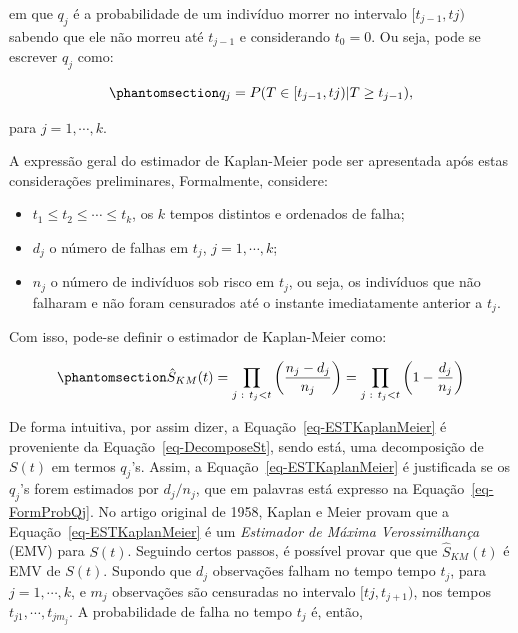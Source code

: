 \documentclass[
  12pt,
  letterpaper,
  DIV=11,
  numbers=noendperiod]{scrreprt}
\providecommand{\tightlist}{%
  \setlength{\itemsep}{0pt}\setlength{\parskip}{0pt}}\usepackage{longtable,booktabs,array}
\begin{document}
\noindent em que \(q_{j}\) é a probabilidade de um indivíduo morrer no
intervalo \([t_{j-1}, t{j})\) sabendo que ele não morreu até \(t_{j-1}\)
e considerando \(t_{0} = 0\). Ou seja, pode se escrever \(q_{j}\) como:

\begin{equation}\phantomsection\label{eq-FormProbQj}{
q_{j} = P(T \in [t_{j-1}, t{j}) | T \geq t_{j-1}),
}\end{equation}

\noindent para \(j = 1, \cdots, k\).

A expressão geral do estimador de Kaplan-Meier pode ser apresentada após
estas considerações preliminares, Formalmente, considere:

\begin{itemize}
\tightlist
\item
  \(t_{1} \leq t_{2} \leq \cdots \leq t_{k}\), os \(k\) tempos distintos
  e ordenados de falha;
\item
  \(d_{j}\) o número de falhas em \(t_{j}\), \(j = 1, \cdots, k\);
\item
  \(n_{j}\) o número de indivíduos sob risco em \(t_{j}\), ou seja, os
  indivíduos que não falharam e não foram censurados até o instante
  imediatamente anterior a \(t_{j}\).
\end{itemize}

Com isso, pode-se definir o estimador de Kaplan-Meier como:

\begin{equation}\phantomsection\label{eq-ESTKaplanMeier}{
\hat{S}_{KM}(t) = \prod_{j \text{ : } t_{j} < t} \left( \dfrac{n_{j} - d_{j}}{n_{j}} \right) = \prod_{j \text{ : } t_{j} < t} \left( 1 - \dfrac{d_{j}}{n_{j}} \right)
}\end{equation}

De forma intuitiva, por assim dizer, a Equação~\ref{eq-ESTKaplanMeier} é
proveniente da Equação~\ref{eq-DecomposeSt}, sendo está, uma
decomposição de \(S(t)\) em termos \(q_{j}\)'s. Assim, a
Equação~\ref{eq-ESTKaplanMeier} é justificada se os \(q_{j}\)'s forem
estimados por \(d_{j}/n_{j}\), que em palavras está expresso na
Equação~\ref{eq-FormProbQj}. No artigo original de 1958, Kaplan e Meier
provam que a Equação~\ref{eq-ESTKaplanMeier} é um \emph{Estimador de
Máxima Verossimilhança} (EMV) para \(S(t)\). Seguindo certos passos, é
possível provar que que \(\hat{S}_{KM}(t)\) é EMV de \(S(t)\). Supondo
que \(d_{j}\) observações falham no tempo tempo \(t_{j}\), para
\(j = 1, \cdots, k\), e \(m_{j}\) observações são censuradas no
intervalo \([t{j}, t_{j+1})\), nos tempos
\(t_{j1}, \cdots, t_{jm_{j}}\). A probabilidade de falha no tempo
\(t_{j}\) é, então,
\end{document}
